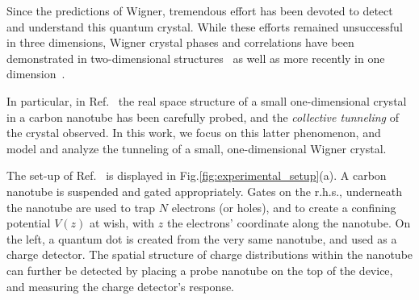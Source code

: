 \documentclass[aps, prb, floatfix, twocolumn, notitlepage, superscriptaddress, 10pt]{revtex4-2}
\newcommand{\1}{{1\hspace*{-0.5ex} \textrm{l} \hspace*{0.5ex}}}
\begin{document}
Since the predictions of Wigner, tremendous effort has been devoted to detect and understand this quantum crystal. 
While  these efforts remained unsuccessful in three dimensions, Wigner crystal phases and correlations 
have been demonstrated   in two-dimensional structures~
\cite{Andrei1988, Meyer2009, Jiang1990, Goldman1990, Buhmann1991,Santos1992, Shirahama1995,Yoon1999,Chen2006,Zhu2010, Tiemann2014,Deng2016, Deng2019, Ma2020, Regan2020, Smoleski2021,Zhou2021,Li2021, Villegas2021, Falson2022, Hossain2022} as well as  more recently  in one 
dimension~\cite{Shapir.2019,Deshpande.2008}. 

In particular, in Ref.~\cite{Shapir.2019} the real space structure of a small one-dimensional crystal in a carbon nanotube 
has been carefully probed, and the \emph{collective tunneling} of the crystal observed. In this work, we focus on this latter 
phenomenon, and model and analyze the tunneling of a small, one-dimensional Wigner crystal. 

The  set-up of Ref.~\cite{Shapir.2019} is displayed in Fig.\ref{fig:experimental_setup}(a).
A carbon nanotube is suspended and gated appropriately. Gates on the r.h.s., underneath the nanotube
are used to trap $N$ electrons (or holes), and  to create a confining potential $V(z)$ at wish, with $z$ 
the electrons' coordinate along the nanotube. 
On the left, a quantum dot is created from the very same nanotube, and used as a charge detector. 
The spatial structure of charge distributions within the nanotube can further be detected 
by placing a probe nanotube on the top of the device, and measuring the charge detector's response.
\end{document}

